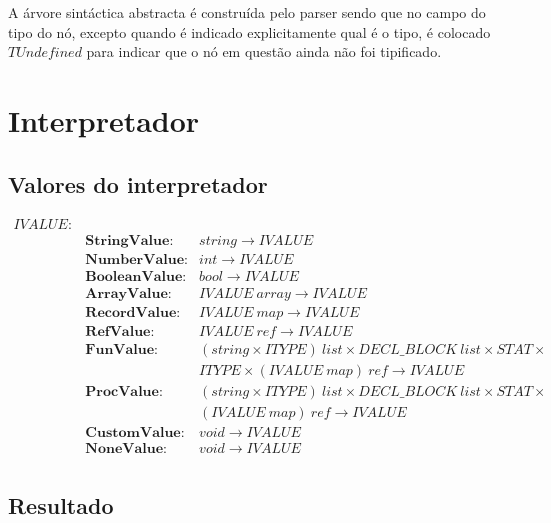 A árvore sintáctica abstracta é construída pelo parser sendo que no campo do 
tipo do nó, excepto quando é indicado explicitamente qual é o tipo, é colocado 
$TUndefined$ para indicar que o nó em questão ainda não foi tipificado.

\newpage
\section{Interpretador}

\subsection{Valores do interpretador}

{
\fontsize{9pt}{10}\selectfont
\ttfamily
$
\begin{array}{llll}
IVALUE:	&\\
		&\textbf{StringValue:}	&string \rightarrow IVALUE\\
		&\textbf{NumberValue:}	&int \rightarrow IVALUE\\
		&\textbf{BooleanValue:}	&bool \rightarrow IVALUE\\
		&\textbf{ArrayValue:}	&IVALUE~array \rightarrow IVALUE\\
		&\textbf{RecordValue:}	&IVALUE~map \rightarrow IVALUE\\
		&\textbf{RefValue:}		&IVALUE~ref \rightarrow IVALUE\\
		&\textbf{FunValue:}		&(string \times ITYPE)~list \times 
										DECL\_BLOCK~list \times STAT \times \\
		&&ITYPE \times (IVALUE~map)~ref \rightarrow IVALUE\\
		&\textbf{ProcValue}:	&(string \times ITYPE)~list \times 
										DECL\_BLOCK~list \times STAT \times \\
		&&(IVALUE~map)~ref \rightarrow IVALUE\\
		&\textbf{CustomValue}:	&void \rightarrow IVALUE\\
		&\textbf{NoneValue}:	&void \rightarrow IVALUE\\
\end{array}
$
}\\

\subsection{Resultado}

